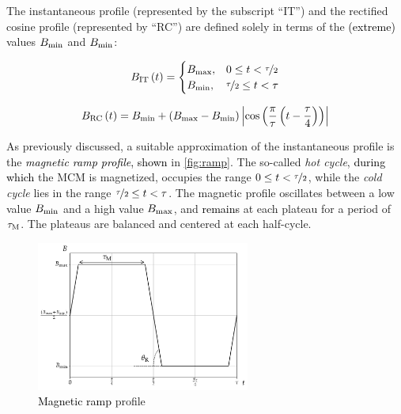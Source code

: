 \documentclass[referee]{svjour3}
\begin{document}
The instantaneous profile (represented by the subscript ``IT'') and the rectified cosine profile (represented by ``RC'') are defined solely in terms of the \textcolor{black}{(extreme)} values $B_{\mathrm{min}}$ and $B_{\mathrm{min}}$:


\begin{equation}
{B}_{\mathrm{IT}}\,(t)=
\begin{cases}
{B}_{\mathrm{max}}, & 0 \le t < \nicefrac{\tau}{2} \\
{B}_{\mathrm{min}}, & \nicefrac{\tau}{2} \le t < \tau\\
\end{cases}
\label{eq:199}
\end{equation}

\begin{equation}
{B}_{\mathrm{RC}}\,(t) = B_{\mathrm{min}} + \left(B_{\mathrm{max}} - B_{\mathrm{min}}\right)  \left\lvert \cos\left( \frac{\pi}{\tau} \left( t - \frac{\tau}{4}\right)\right) \right\rvert
\label{eq:200}
\end{equation}

As previously discussed, a suitable approximation of the instantaneous profile is the \textcolor{black}{\emph{magnetic ramp profile}, shown} in \autoref{fig:ramp}. The so-called \emph{hot cycle}, \textcolor{black}{during which} the MCM is magnetized, occupies the range \(0 \le t < \nicefrac{\tau}{2}\), while the \emph{cold cycle} lies in the range \(\nicefrac{\tau}{2} \le t < \tau\). The magnetic profile oscillates  between a low value \({B}_{\mathrm{min}}\) and a high value \({B}_{\mathrm{max}}\), and \textcolor{black}{remains} at each plateau for a period of \(\tau_{\mathrm{M}}\). The plateaus are balanced and centered at each half-cycle.

\begin{figure}[!ht]
  \centering
  \includegraphics[width=7cm]{profile_rm}
  \caption{\textcolor{black}{Magnetic ramp}  profile}
  \label{fig:ramp}
\end{figure}
\end{document}
